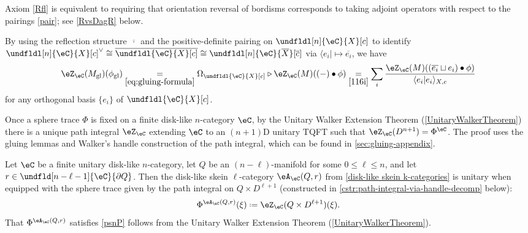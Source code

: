 \documentclass[12pt,reqno]{amsart}
\newcommand{\glu}{\mathrm{gl}}
\newcommand{\psn}{\Phi}
\newcommand{\A}{\eA}
\newcommand{\C}{\eC}
\newcommand{\Z}{\eZ}
\newcommand{\blt}{\bullet}
\newcommand{\fcj}[1]{\overline{#1}}
\newcommand{\orev}{\overline}
\newcommand{\bra}[1]{\langle#1\rvert}
\newcommand{\bkt}[2]{\langle #1|#2 \rangle}
\renewcommand{\amalg}{\sqcup}
\DeclareRobustCommand{\coloneq}{\mathrel{\vcenter{\baselineskip0.5ex\lineskiplimit0pt\hbox{\scriptsize{\upshape.}}\hbox{\scriptsize{\upshape.}}}}=}
\begin{document}
Axiom \ref{Rfl} is equivalent to requiring that orientation reversal of bordisms corresponds to taking adjoint operators with respect to the pairings \eqref{pair}; see \cref{RvsDagR} below.

\begin{remark}
 By using the reflection structure $\fcj{\,\cdot\,}$ and the positive-definite pairing on $\undfldl[n]{\C}{X}[c]$ to identify $\undfldl[n]{\C}{X}[c]^\vee\cong\overline{\undfldl{\C}{X}[c]}\cong \undfldl[n]{\C}{\orev X}[\fcj c]$ via $\bra{e_i}\mapsto\fcj{e_i}$, we have
  \[
      \Z_\C(M_\glu)(\phi_\glu)
      \underset{\eqref{eq:gluing-formula}}{=}
      \Omega_{\text{$\undfldl{\C}{X}[c]$}}\triangleright\Z_\C(M)\!\left((-)\blt\phi\right)
      \underset{\eqref{116i}}{=}
      \sum_i\frac{\Z_\C(M)
      ((\fcj{e_i}\amalg e_i)\blt\phi)}{\bkt{e_i}{e_i}_{X,c}}
  \]
  for any orthogonal basis $\{e_i\}$ of $\undfldl{\C}{X}[c]$. 
\end{remark}


Once a sphere trace $\psn$ is fixed on a finite disk-like $n$-category $\C$, by the Unitary Walker Extension Theorem (\cref{UnitaryWalkerTheorem}) there is a unique path integral $\Z_\C$ extending $\C$ to an $(n+1)$D unitary TQFT such that $\Z_\C(D^{n+1})=\psn^\C$. The proof uses the gluing lemmas and Walker's handle construction of the path integral, which can be found in \cref{sec:gluing-appendix}.


\begin{example}
\label{inducspwt}
Let $\C$ be a finite unitary disk-like $n$-category, let $Q$ be an $(n-\ell)$-manifold for some $0\leq \ell\leq n$, and let $r\in\undfld[n-\ell-1]{\C}{\partial Q}$. Then the disk-like skein $\ell$-category $\A_\C(Q,r)$ from \cref{disk-like skein k-categories} is unitary when equipped with the sphere trace given by the path integral on $Q\times D^{\ell+1}$ (constructed in \cref{cstr:path-integral-via-handle-decomp} below):
\[
\psn^{\A_\C(Q,r)}(\xi)
\coloneq
\Z_\C(Q\times D^{\ell+1})(\xi).
\]
That $\psn^{\A_\C(Q,r)}$ satisfies \ref{psnP} follows from the Unitary Walker Extension Theorem (\cref{UnitaryWalkerTheorem}).
\end{example}
\end{document}
